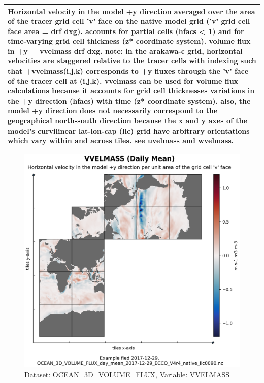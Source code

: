 \begin{longtable}{|m{}|m{}|m{}|m{}|}
\multicolumn{4}{|p{1\textwidth}|}{Horizontal velocity in the model +y direction averaged over the area of the tracer grid cell 'v' face on the native model grid ('v' grid cell face area = drf dxg). accounts for partial cells (hfacs < 1) and for time-varying grid cell thickness (z* coordinate system). volume flux in +y = vvelmass drf dxg. note: in the arakawa-c grid, horizontal velocities are staggered relative to the tracer cells with indexing such that +vvelmass(i,j,k) corresponds to +y fluxes through the 'v' face of the tracer cell at (i,j,k). vvelmass can be used for volume flux calculations because it accounts for grid cell thicknesses variations in the +y direction (hfacs) with time (z* coordinate system). also, the model +y direction does not necessarily correspond to the geographical north-south direction because the x and y axes of the model's curvilinear lat-lon-cap (llc) grid have arbitrary orientations which vary within and across tiles. see uvelmass and wvelmass.} \\ \hline
\end{longtable}

\begin{figure}[H]
\centering
\includegraphics[scale=0.55]{../images/plots/native_plots/Ocean_Three-Dimensional_Volume_Fluxes/VVELMASS.png}
\caption{Dataset: OCEAN\_3D\_VOLUME\_FLUX, Variable: VVELMASS}
\label{tab:table-OCEAN_3D_VOLUME_FLUX_VVELMASS-Plot}
\end{figure}
\pagebreak
